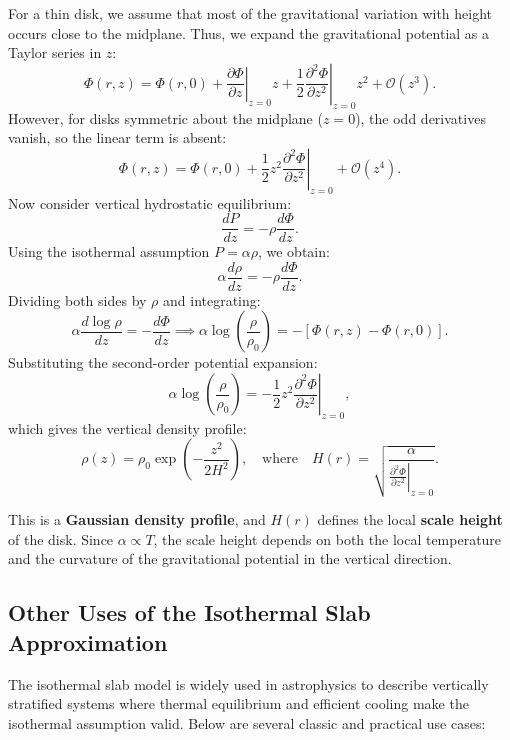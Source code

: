 For a thin disk, we assume that most of the gravitational variation with height occurs close to the midplane. Thus, we expand the gravitational potential as a Taylor series in $z$:
\[
\Phi(r,z) = \Phi(r,0) + \left.\frac{\partial \Phi}{\partial z}\right|_{z=0} z + \frac{1}{2} \left.\frac{\partial^2 \Phi}{\partial z^2}\right|_{z=0} z^2 + \mathcal{O}(z^3).
\]
However, for disks symmetric about the midplane ($z = 0$), the odd derivatives vanish, so the linear term is absent:
\[
\Phi(r,z) = \Phi(r,0) + \frac{1}{2} z^2 \left.\frac{\partial^2 \Phi}{\partial z^2}\right|_{z=0} + \mathcal{O}(z^4).
\]
Now consider vertical hydrostatic equilibrium:
\[
\frac{dP}{dz} = -\rho \frac{d\Phi}{dz}.
\]
Using the isothermal assumption \( P = \alpha \rho \), we obtain:
\[
\alpha \frac{d\rho}{dz} = -\rho \frac{d\Phi}{dz}.
\]
Dividing both sides by \( \rho \) and integrating:
\[
\alpha \frac{d \log \rho}{dz} = -\frac{d\Phi}{dz} \implies \alpha \log \left( \frac{\rho}{\rho_0} \right) = -\left[ \Phi(r,z) - \Phi(r,0) \right].
\]
Substituting the second-order potential expansion:
\[
\alpha \log \left( \frac{\rho}{\rho_0} \right) = -\frac{1}{2} z^2 \left.\frac{\partial^2 \Phi}{\partial z^2} \right|_{z=0},
\]
which gives the vertical density profile:
\[
\boxed{
\rho(z) = \rho_0 \exp\left( - \frac{z^2}{2H^2} \right),
}
\quad \text{where} \quad H(r) = \sqrt{ \frac{\alpha}{ \left. \frac{\partial^2 \Phi}{\partial z^2} \right|_{z=0} } }.
\]

This is a \textbf{Gaussian density profile}, and $H(r)$ defines the local \textbf{scale height} of the disk. Since \( \alpha \propto T \), the scale height depends on both the local temperature and the curvature of the gravitational potential in the vertical direction.

\subsection{Other Uses of the Isothermal Slab Approximation}

The isothermal slab model is widely used in astrophysics to describe vertically stratified systems where thermal equilibrium and efficient cooling make the isothermal assumption valid. Below are several classic and practical use cases:

